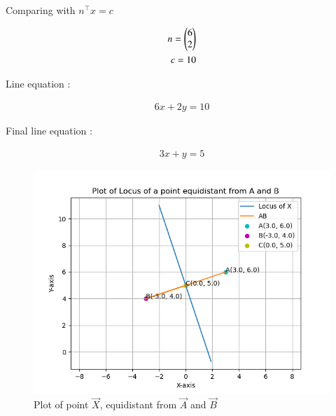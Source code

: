 \documentclass[journal]{IEEEtran}
\begin{document}
Comparing with $n^\top x=c$

\begin{align}
	n=\begin{pmatrix}6 \\ 2\end{pmatrix}\label{eq1.8.11.6}\\
	c=10
\end{align}

Line equation :

\begin{align}
	6x+2y=10 \label{eq1.8.11.7}
\end{align}

Final line equation :

\begin{align}
	3x+y=5 \label{eq1.8.11.8}
\end{align}

\begin{figure}[h!]
   \centering
   \includegraphics[width=0.8\linewidth]{figs/plot.png}
   \caption{Plot of point $\vec{X}$, equidistant from $\vec{A}$ and $\vec{B}$}
\label{stemplot}
\end{figure}
\end{document}
